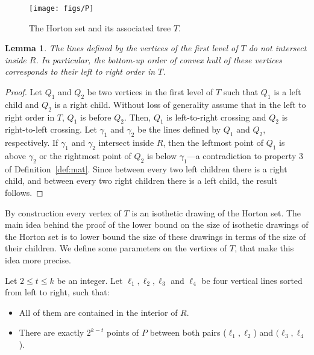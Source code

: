 \documentclass{article}
\newtheorem{lemma}[theorem]{Lemma}
\begin{document}
\begin{figure}
\begin{center}
\texttt{[image: figs/P]}
\end{center}
\caption{The Horton set and its associated tree $T$.}
\label{fig:T}
\end{figure}

\begin{lemma}\label{lem:no_cut} 
The lines defined by the vertices
of the first level of $T$ do not intersect inside $R$. In particular, the bottom-up
order of convex hull of these vertices corresponds to their
left to right order in $T$.
\end{lemma}
\begin{proof}


Let $Q_1$ and $Q_2$ be two vertices in the first level of $T$
such that $Q_1$ is a left child and $Q_2$ is a right child.
Without loss of generality assume that in the left to right order in $T$, $Q_1$ 
is before $Q_2$. 
Then, $Q_1$ is left-to-right crossing and $Q_2$ is
right-to-left crossing. Let $\gamma_1$ and $\gamma_2$ 
be the lines defined by $Q_1$ and $Q_2$, respectively.
If $\gamma_1$ and $\gamma_2$ intersect inside $R$, then
the leftmost point of $Q_1$ is above $\gamma_2$ or
the rightmost point of $Q_2$ is below $\gamma_1$---a contradiction to
property 3 of Definition~\ref{def:mat}.
Since between every two left children
there is a right child, and between every two right children
there is a left child, the result follows.
\end{proof}

By construction every vertex of $T$ is an isothetic drawing of the Horton set.  
The main idea behind the proof of the lower bound on the size of isothetic drawings
of the Horton set is to lower bound the size of these
drawings in terms of the size of their children. We define some parameters
on the vertices of $T$, that make this idea more precise. 

Let $2 \le t \le k$ be an integer. Let $\ell_1, \ell_2, \ell_3$ and $\ell_4$ be four vertical lines sorted from left to right, such that:
\begin{itemize}
 \item All of them are contained in the interior of $R$.
 
 \item There are exactly $2^{k-t}$
points of $P$ between both pairs ($\ell_1,\ell_2$) and $(\ell_3,\ell_4$). 
\end{itemize}
\end{document}
